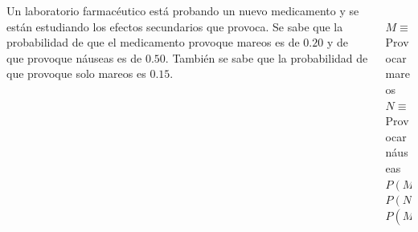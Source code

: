 \documentclass[aspectratio=149,10pt,xcolor=dvipsnames,t]{beamer}
\begin{document}
	
\begin{frame}
	\begin{columns}
		\begin{column}[T]{0.7\textwidth}
			Un laboratorio farmacéutico está probando un nuevo medicamento y se están estudiando los efectos secundarios que
			provoca.
			Se sabe que la probabilidad de que el medicamento provoque mareos es de $0.20$ y de que provoque náuseas es de $0.50$. 
			También se sabe que la probabilidad de que provoque solo mareos es $0.15$.
		\end{column}
		\begin{column}[T]{0.3\textwidth}
			\\
			$M \equiv$ Provocar mareos\\
			$N \equiv$ Provocar náuseas\\
			$P(M)=0.2$\\
			$P(N)=0.5$\\
			$P(M\cap \overline N)=0.15$
		\end{column}
	\end{columns}
\end{frame}
	
\end{document}
